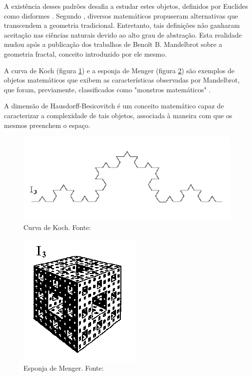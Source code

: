 \documentclass{ufscThesis}
\begin{document}
A existência desses padrões desafia a estudar estes objetos, definidos por Euclides como disformes \cite{mandelbrot1983fractal}. Segundo , diversos matemáticos propuseram alternativas que transcendem a geometria tradicional. Entretanto, tais definições não ganharam aceitação nas ciências naturais devido ao alto grau de abstração. Esta realidade mudou após a publicação dos trabalhos de Benoît B. Mandelbrot sobre a geometria fractal, conceito introduzido por ele mesmo.\par
A curva de Koch (figura \ref{koch}) e a esponja de Menger (figura \ref{menger}) são exemplos de objetos matemáticos que exibem as características observadas por Mandelbrot, que foram, previamente, classificados como "monstros matemáticos" \cite{TeseGar}.\par
A dimensão de Hausdorff-Besicovitch é um conceito matemático capaz de caracterizar a complexidade de tais objetos, associada à maneira com que os mesmos preenchem o espaço. \cite{Figueiredo2013}


\begin{figure}[!h]
\centering
\includegraphics[scale=0.5]{koch.png}
\caption{Curva de Koch. Fonte: }
\label{koch}
\end{figure}

\begin{figure}[!h]
\centering
\includegraphics[scale=0.5]{menger.png}
\caption{Esponja de Menger. Fonte: }
\label{menger}
\end{figure}
\end{document}
